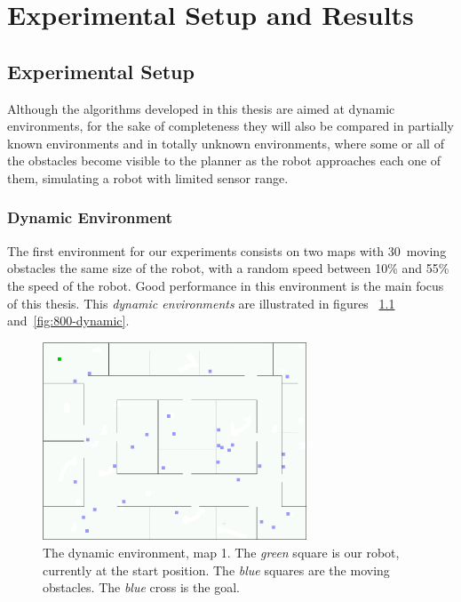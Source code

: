 \chapter{Experimental Setup and Results}

\section{Experimental Setup}
\label{sec:experimentalsetup}

Although the algorithms developed in this thesis are aimed at dynamic
environments, for the sake of completeness they will also be compared in
partially known environments and in totally unknown environments, where some or
all of the obstacles become visible to the planner as the robot approaches each
one of them, simulating a robot with limited sensor range.

\subsection{Dynamic Environment}

The first environment for our experiments consists on two maps with 30~moving
obstacles the same size of the robot, with a random speed between 10\% and 55\%
the speed of the robot. Good performance in this environment is the main focus
of this thesis. This \emph{dynamic environments} are illustrated in figures~%
\ref{fig:office-dynamic} and~\ref{fig:800-dynamic}.

\begin{figure}[h!]
\begin{center}
\includegraphics[width=0.7\textwidth]{images/office-dynamic}
\caption[The dynamic environment, map 1]{The dynamic environment, map 1. The \emph{green} square is our robot,
currently at the start position. The
\emph{blue} squares are the moving obstacles. The \emph{blue} cross is the goal.}
\label{fig:office-dynamic}
\end{center}
\end{figure}

